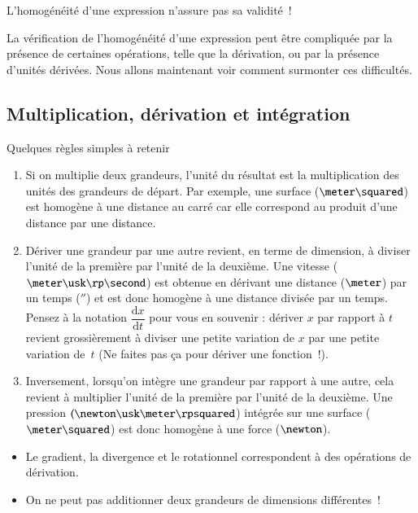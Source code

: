 \documentclass[12pt]{book}
\begin{document}
\begin{attention}
	L'homogénéité d'une expression n'assure pas sa validité~!
\end{attention}

La vérification de l'homogénéité d'une expression peut être compliquée par la présence de certaines opérations,
telle que la dérivation, ou par la présence d'unités dérivées. 
Nous allons maintenant voir comment surmonter 
ces difficultés.
\subsection{Multiplication, dérivation et intégration}
Quelques règles simples à retenir

\begin{enumerate}
	\item Si on multiplie deux grandeurs, l'unité du résultat est 
	  la multiplication des unités des grandeurs de départ. Par exemple,
	  une surface ($\meter \squared$)
	  est homogène  à une distance au carré car elle correspond
	  au produit d'une distance par une distance.
	\item Dériver une grandeur par une autre revient, en terme de dimension,
		à diviser l'unité de la première par l'unité de la deuxième. Une vitesse ($\meter \usk \rp \second$)
		est obtenue en dérivant une distance ($\meter$) par un temps ($\second$) 
		et est donc homogène à une distance
	  divisée par un temps. Pensez à la notation 
	  $\dfrac{\mathrm{d}x}{\mathrm{d}t}$ pour vous en souvenir : dériver
	  $x$ par rapport à $t$ revient grossièrement à diviser une petite 
	  variation de $x$ par une petite variation de~$t$ 
	  (Ne faites pas ça pour dériver une fonction~!).
	\item Inversement, lorsqu'on intègre une grandeur par rapport à une autre, cela
	  revient à multiplier l'unité de la première par l'unité de la deuxième.
	  Une pression $(\newton \usk \meter \rpsquared$) intégrée sur une surface ($\meter \squared$) 
	  est donc homogène à une force ($\newton$).
\end{enumerate}

\begin{rema}
\begin{itemize}
	\item Le gradient, la divergence et le rotationnel correspondent à des 
	opérations de dérivation.
	\item On ne peut pas additionner deux grandeurs de dimensions 
	  différentes~!
\end{itemize}
\end{rema}
\end{document}
